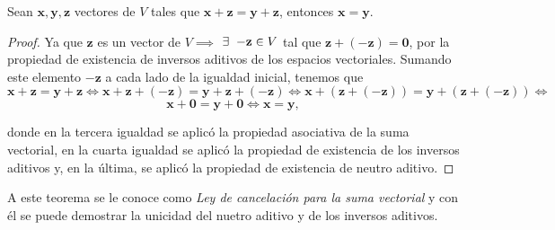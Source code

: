 \documentclass[12pt,dvipsnames]{article}
\newenvironment{teorema}[2][Teorema]{\begin{trivlist}
\item[\hskip \labelsep {\bfseries #1}\hskip \labelsep {\bfseries #2.}]}{\end{trivlist}}
\begin{document}
\begin{teorema} {1.2.3.1}
Sean $\mathbf{x},\mathbf{y},\mathbf{z}$ vectores de $V$ tales que $\mathbf{x}+\mathbf{z}=\mathbf{y}+\mathbf{z}$, entonces $\mathbf{x}=\mathbf{y}$.

\begin{proof}
Ya que $\mathbf{z}$ es un vector de $V\implies$ $\exists\hspace{2mm} \mathbf{-z}\in V$ tal que $\mathbf{z} + (-\mathbf{z}) = \mathbf{0}$, por la propiedad de existencia de inversos aditivos de los espacios vectoriales. Sumando este elemento $-\mathbf{z}$ a cada lado de la igualdad inicial, tenemos que $$\mathbf{x}+\mathbf{z}=\mathbf{y}+\mathbf{z}\iff\mathbf{x}+\mathbf{z}+ (-\mathbf{z})=\mathbf{y}+\mathbf{z}+ (-\mathbf{z})\iff\mathbf{x}+(\mathbf{z}+ (-\mathbf{z}))=\mathbf{y}+(\mathbf{z}+ (-\mathbf{z}))\iff$$ $$ \mathbf{x}+\mathbf{0}=\mathbf{y}+\mathbf{0}\iff\mathbf{x}=\mathbf{y},$$

\noindent donde en la tercera igualdad se aplicó la propiedad asociativa de la suma vectorial, en la cuarta igualdad se aplicó la propiedad de existencia de los inversos aditivos y, en la última, se aplicó la propiedad de existencia de neutro aditivo.
\end{proof}
A este teorema se le conoce como \emph{Ley de cancelación para la suma vectorial} y con él se puede demostrar la unicidad del nuetro aditivo y de los inversos aditivos.
\end{teorema}
\end{document}
